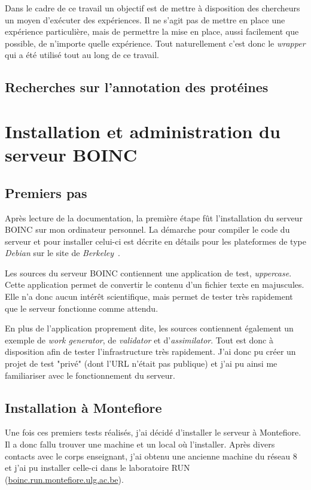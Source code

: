 \documentclass[a4paper, 11pt]{report}
\begin{document}
Dans le cadre de ce travail un objectif est de mettre à disposition des chercheurs un moyen d'exécuter des expériences. Il ne s'agit pas de mettre en place une expérience particulière, mais de permettre la mise en place, aussi facilement que possible, de n'importe quelle expérience. Tout naturellement c'est donc le \textit{wrapper} qui a été utilisé tout au long de ce travail.


\section{Recherches sur l'annotation des protéines}
\label{proteines}

\chapter{Installation et administration du serveur \textsc{BOINC}}

\section{Premiers pas}
Après lecture de la documentation, la première étape fût l'installation du serveur \textsc{BOINC} sur mon ordinateur personnel. La démarche pour compiler le code du serveur et pour installer celui-ci est décrite en détails pour les plateformes de type \textit{Debian} sur le site de \textit{Berkeley}~\cite{BOINC}.

Les sources du serveur \textsc{BOINC} contiennent une application de test, \textit{uppercase}. Cette application permet de convertir le contenu d'un fichier texte en majuscules. Elle n'a donc aucun intérêt scientifique, mais permet de tester très rapidement que le serveur fonctionne comme attendu.

En plus de l'application proprement dite, les sources contiennent également un exemple de \textit{work generator}, de \textit{validator} et d'\textit{assimilator}. Tout est donc à disposition afin de tester l'infrastructure très rapidement. J'ai donc pu créer un projet de test "privé" (dont l'URL n'était pas publique) et j'ai pu ainsi me familiariser avec le fonctionnement du serveur.

\section{Installation à Montefiore}
Une fois ces premiers tests réalisés, j'ai décidé d'installer le serveur à Montefiore. Il a donc fallu trouver une machine et un local où l'installer. Après divers contacts avec le corps enseignant, j'ai obtenu une ancienne machine du réseau 8 et j'ai pu installer celle-ci dans le laboratoire RUN (\url{boinc.run.montefiore.ulg.ac.be}).
\end{document}
